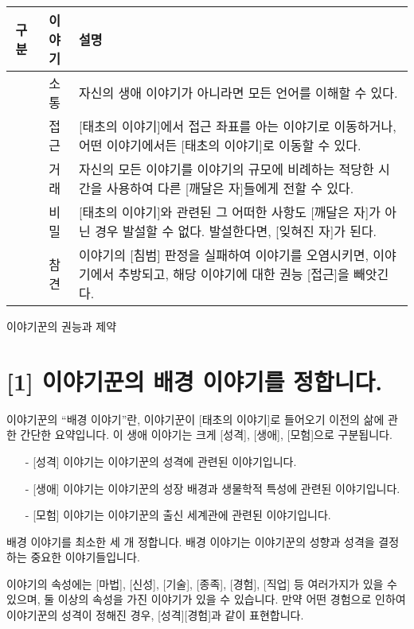 \documentclass[12pt]{report}
\begin{document}
	\begin{tabularx}{\textwidth}{c|c|X}
		\hline
		\textbf{구분} & \textbf{이야기} & \textbf{설명} \\ \hline \hline
		[권능] & 소통 & 자신의 생애 이야기가 아니라면 모든 언어를 이해할 수 있다. \\ \hline
		[권능] & 접근 & [태초의 이야기]에서 접근 좌표를 아는 이야기로 이동하거나, 어떤 이야기에서든 [태초의 이야기]로 이동할 수 있다. \\ \hline
		[권능] & 거래 & 자신의 모든 이야기를 이야기의 규모에 비례하는 적당한 시간을 사용하여 다른 [깨달은 자]들에게 전할 수 있다. \\ \hline
		[제약] & 비밀 & [태초의 이야기]와 관련된 그 어떠한 사항도 [깨달은 자]가 아닌 경우 발설할 수 없다. 발설한다면, [잊혀진 자]가 된다. \\ \hline
		[제약] & 참견 & 이야기의 [침범] 판정을 실패하여 이야기를 오염시키면, 이야기에서 추방되고, 해당 이야기에 대한 권능 [접근]을 빼앗긴다. \\\hline
	\end{tabularx}
	
	\begin{center}
		이야기꾼의 권능과 제약
	\end{center}
	
	\section*{[1] 이야기꾼의 배경 이야기를 정합니다.}
	
	이야기꾼의 “배경 이야기”란, 이야기꾼이 [태초의 이야기]로 들어오기 이전의 삶에 관한 간단한 요약입니다. 이 생애 이야기는 크게 [성격], [생애], [모험]으로 구분됩니다.
	\begin{itemize}
		\item[-] [성격] 이야기는 이야기꾼의 성격에 관련된 이야기입니다.
		\item[-] [생애] 이야기는 이야기꾼의 성장 배경과 생물학적 특성에 관련된 이야기입니다.
		\item[-] [모험] 이야기는 이야기꾼의 출신 세계관에 관련된 이야기입니다.
	\end{itemize}
	
	배경 이야기를 최소한 세 개 정합니다. 배경 이야기는 이야기꾼의 성향과 성격을 결정하는 중요한 이야기들입니다.
	
	이야기의 속성에는 [마법], [신성], [기술], [종족], [경험], [직업] 등 여러가지가 있을 수 있으며, 둘 이상의 속성을 가진 이야기가 있을 수 있습니다. 만약 어떤 경험으로 인하여 이야기꾼의 성격이 정해진 경우, [성격][경험]과 같이 표현합니다.
	
\end{document}
